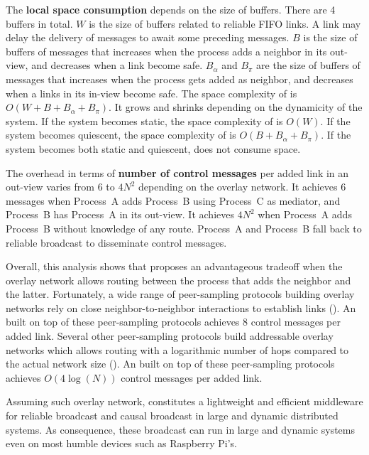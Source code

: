\noindent The \textbf{local space consumption} depends on the size of
buffers. There are 4 buffers in total. $W$ is the size of buffers related to
reliable FIFO links. A link may delay the delivery of messages to await some
preceding messages. $B$ is the size of buffers of messages that increases when
the process adds a neighbor in its out-view, and decreases when a link become
safe. $B_\alpha$ and $B_\pi$ are the size of buffers of messages that increases
when the process gets added as neighbor, and decreases when a links in its
in-view become safe. The space complexity of \RPCBROADCAST is
$O(W + B + B_\alpha + B_\pi)$. It grows and shrinks depending on the dynamicity
of the system. If the system becomes static, the space complexity of
\RPCBROADCAST is $O(W)$. If the system becomes quiescent, the space complexity
of \RPCBROADCAST is $O(B + B_\alpha + B_\pi)$.  If the system becomes both
static and quiescent, \RPCBROADCAST does not consume
space. 

\noindent The overhead in terms of \textbf{number of control messages} per added
link in an out-view varies from $6$ to $4N^2$ depending on the overlay
network. It achieves $6$ messages when Process~A adds Process~B using Process~C
as mediator, and Process~B has Process~A in its out-view. It achieves $4N^2$
when Process~A adds Process~B without knowledge of any route. Process~A and
Process~B fall back to reliable broadcast to disseminate control
messages. 

Overall, this analysis shows that \RPCBROADCAST proposes an advantageous
tradeoff when the overlay network allows routing between the process that adds
the neighbor and the latter. Fortunately, a wide range of peer-sampling
protocols building overlay networks rely on close neighbor-to-neighbor
interactions to establish links (\REF). An \RPCBROADCAST built on top of these
peer-sampling protocols achieves $8$ control messages per added link. Several
other peer-sampling protocols build addressable overlay networks which allows
routing with a logarithmic number of hops compared to the actual network size
(\REF). An \RPCBROADCAST built on top of these peer-sampling protocols achieves
$O(4\log(N))$ control messages per added link.

Assuming such overlay network, \RPCBROADCAST constitutes a lightweight and
efficient middleware for reliable broadcast and causal broadcast in large and
dynamic distributed systems. As consequence, these broadcast can run in large
and dynamic systems even on most humble devices such as Raspberry Pi's.


